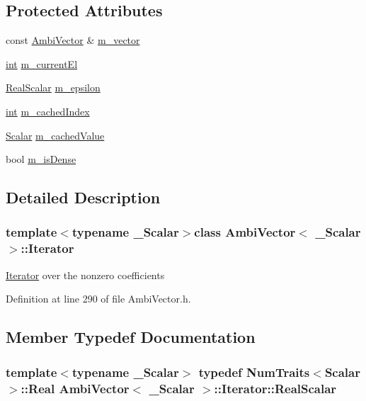 \subsection*{Protected Attributes}
\begin{DoxyCompactItemize}
\item 
const \hyperlink{class_ambi_vector}{Ambi\-Vector} \& \hyperlink{class_ambi_vector_1_1_iterator_aaa2a76c6c5505e34055e7c00ce05d621}{m\-\_\-vector}
\item 
\hyperlink{ioapi_8h_a787fa3cf048117ba7123753c1e74fcd6}{int} \hyperlink{class_ambi_vector_1_1_iterator_adc920f115aa20828b40c85b45324058b}{m\-\_\-current\-El}
\item 
\hyperlink{class_ambi_vector_1_1_iterator_acf5b6b8ccac8e159e4787202adc9591a}{Real\-Scalar} \hyperlink{class_ambi_vector_1_1_iterator_ad9cc037301d3fb4f49969dfa3e9ca6c1}{m\-\_\-epsilon}
\item 
\hyperlink{ioapi_8h_a787fa3cf048117ba7123753c1e74fcd6}{int} \hyperlink{class_ambi_vector_1_1_iterator_ac7845ff7b1d7e8f874c0239d241bab04}{m\-\_\-cached\-Index}
\item 
\hyperlink{class_ambi_vector_1_1_iterator_a4b1d3f851039dfc016760c87ef570a32}{Scalar} \hyperlink{class_ambi_vector_1_1_iterator_a7cd798dc30a2cea4ce008259836c2d6c}{m\-\_\-cached\-Value}
\item 
bool \hyperlink{class_ambi_vector_1_1_iterator_a77c83fead6fa25c862cdb54911b18d08}{m\-\_\-is\-Dense}
\end{DoxyCompactItemize}


\subsection{Detailed Description}
\subsubsection*{template$<$typename \-\_\-\-Scalar$>$class Ambi\-Vector$<$ \-\_\-\-Scalar $>$\-::\-Iterator}

\hyperlink{class_ambi_vector_1_1_iterator}{Iterator} over the nonzero coefficients 

Definition at line 290 of file Ambi\-Vector.\-h.



\subsection{Member Typedef Documentation}
\hypertarget{class_ambi_vector_1_1_iterator_acf5b6b8ccac8e159e4787202adc9591a}{
\subsubsection[{Real\-Scalar}]{\setlength{\rightskip}{0pt plus 5cm}template$<$typename \-\_\-\-Scalar$>$ typedef {\bf Num\-Traits}$<${\bf Scalar}$>$\-::Real {\bf Ambi\-Vector}$<$ \-\_\-\-Scalar $>$\-::{\bf Iterator\-::\-Real\-Scalar}}}\label{class_ambi_vector_1_1_iterator_acf5b6b8ccac8e159e4787202adc9591a}


